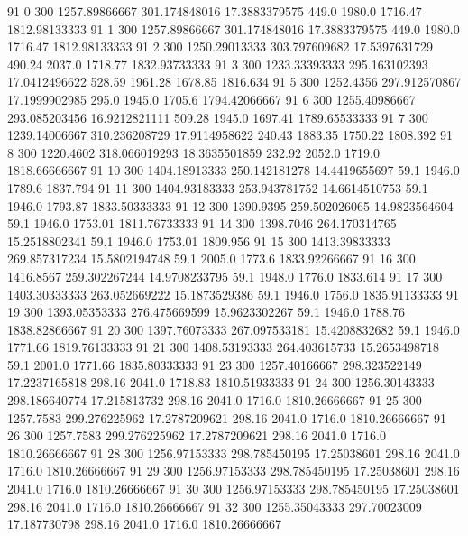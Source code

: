 91  0  300  1257.89866667  301.174848016  17.3883379575  449.0  1980.0  1716.47  1812.98133333 
91  1  300  1257.89866667  301.174848016  17.3883379575  449.0  1980.0  1716.47  1812.98133333 
91  2  300  1250.29013333  303.797609682  17.5397631729  490.24  2037.0  1718.77  1832.93733333 
91  3  300  1233.33393333  295.163102393  17.0412496622  528.59  1961.28  1678.85  1816.634 
91  5  300  1252.4356  297.912570867  17.1999902985  295.0  1945.0  1705.6  1794.42066667 
91  6  300  1255.40986667  293.085203456  16.9212821111  509.28  1945.0  1697.41  1789.65533333 
91  7  300  1239.14006667  310.236208729  17.9114958622  240.43  1883.35  1750.22  1808.392 
91  8  300  1220.4602  318.066019293  18.3635501859  232.92  2052.0  1719.0  1818.66666667 
91  10  300  1404.18913333  250.142181278  14.4419655697  59.1  1946.0  1789.6  1837.794 
91  11  300  1404.93183333  253.943781752  14.6614510753  59.1  1946.0  1793.87  1833.50333333 
91  12  300  1390.9395  259.502026065  14.9823564604  59.1  1946.0  1753.01  1811.76733333 
91  14  300  1398.7046  264.170314765  15.2518802341  59.1  1946.0  1753.01  1809.956 
91  15  300  1413.39833333  269.857317234  15.5802194748  59.1  2005.0  1773.6  1833.92266667 
91  16  300  1416.8567  259.302267244  14.9708233795  59.1  1948.0  1776.0  1833.614 
91  17  300  1403.30333333  263.052669222  15.1873529386  59.1  1946.0  1756.0  1835.91133333 
91  19  300  1393.05353333  276.475669599  15.9623302267  59.1  1946.0  1788.76  1838.82866667 
91  20  300  1397.76073333  267.097533181  15.4208832682  59.1  1946.0  1771.66  1819.76133333 
91  21  300  1408.53193333  264.403615733  15.2653498718  59.1  2001.0  1771.66  1835.80333333 
91  23  300  1257.40166667  298.323522149  17.2237165818  298.16  2041.0  1718.83  1810.51933333 
91  24  300  1256.30143333  298.186640774  17.215813732  298.16  2041.0  1716.0  1810.26666667 
91  25  300  1257.7583  299.276225962  17.2787209621  298.16  2041.0  1716.0  1810.26666667 
91  26  300  1257.7583  299.276225962  17.2787209621  298.16  2041.0  1716.0  1810.26666667 
91  28  300  1256.97153333  298.785450195  17.25038601  298.16  2041.0  1716.0  1810.26666667 
91  29  300  1256.97153333  298.785450195  17.25038601  298.16  2041.0  1716.0  1810.26666667 
91  30  300  1256.97153333  298.785450195  17.25038601  298.16  2041.0  1716.0  1810.26666667 
91  32  300  1255.35043333  297.70023009  17.187730798  298.16  2041.0  1716.0  1810.26666667 

